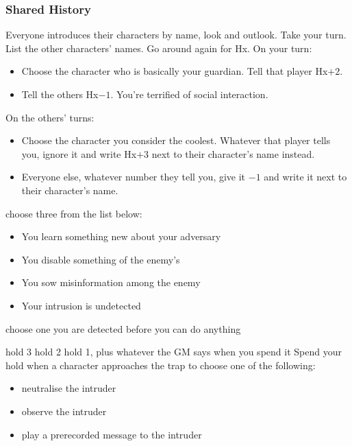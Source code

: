 \subsubsection{Shared History}
Everyone introduces their characters by name, look and outlook. Take
your turn.  List the other characters' names.  Go around again for
Hx. On your turn:
\begin{itemize} %
\item Choose the character who is basically your guardian. Tell that player Hx$+2$.
\item Tell the others Hx$-1$. You're terrified of social interaction.
\end{itemize}
On the others’ turns:
\begin{itemize} %
\item Choose the character you consider the coolest. Whatever that player tells you, ignore it and write Hx$+3$ next to their character's name instead.
\item Everyone else, whatever number they tell you, give it $-1$ and
  write it next to their character’s name.
\end{itemize}

{choose three from the list below:
\begin{itemize}
\item You learn something new about your adversary
\item You disable something of the enemy's
\item You sow misinformation among the enemy
\item Your intrusion is undetected
\end{itemize}}
{choose one}
{you are detected before you can do anything}

{hold 3}
{hold 2}
{hold 1, plus whatever the GM says when you spend it}
Spend your hold when a character approaches the trap to choose one of the following:
\begin{itemize}
\item neutralise the intruder
\item observe the intruder
\item play a prerecorded message to the intruder
\end{itemize}


